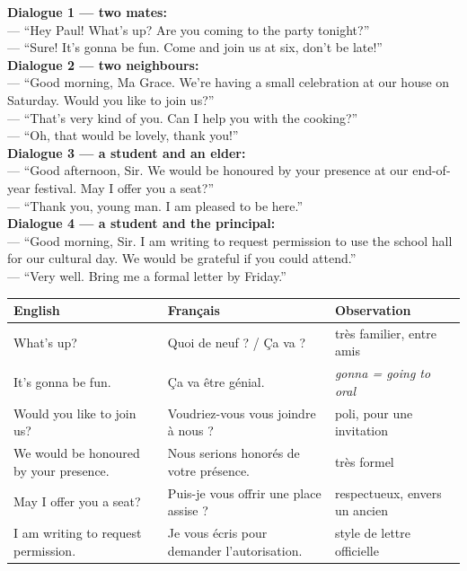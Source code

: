 \documentclass[11pt]{article}
\newcommand{\eng}[1]{\ifmmode\text{\textit{#1}}\else\begingroup\selectlanguage{english}\itshape #1\endgroup\fi}
\begin{document}
\begin{textebox}
\textbf{Dialogue 1 — two mates:}\\
— “Hey Paul! What's up? Are you coming to the party tonight?”\\
— “Sure! It's gonna be fun. Come and join us at six, don't be late!”\\[4pt]
\textbf{Dialogue 2 — two neighbours:}\\
— “Good morning, Ma Grace. We're having a small celebration at our house on Saturday. Would you like to join us?”\\
— “That's very kind of you. Can I help you with the cooking?”\\
— “Oh, that would be lovely, thank you!”\\[4pt]
\textbf{Dialogue 3 — a student and an elder:}\\
— “Good afternoon, Sir. We would be honoured by your presence at our end-of-year festival. May I offer you a seat?”\\
— “Thank you, young man. I am pleased to be here.”\\[4pt]
\textbf{Dialogue 4 — a student and the principal:}\\
— “Good morning, Sir. I am writing to request permission to use the school hall for our cultural day. We would be grateful if you could attend.”\\
— “Very well. Bring me a formal letter by Friday.”
\end{textebox}

\begin{center}
\begin{tabularx}{\linewidth}{|X|X|X|}\hline
\rowcolor{popblueL} \textbf{English} & \textbf{Français} & \textbf{Observation} \\ \hline
What's up? & Quoi de neuf ? / Ça va ? & très familier, entre amis \\ \hline
It's gonna be fun. & Ça va être génial. & \eng{gonna} = \eng{going to} oral \\ \hline
Would you like to join us? & Voudriez-vous vous joindre à nous ? & poli, pour une invitation \\ \hline
We would be honoured by your presence. & Nous serions honorés de votre présence. & très formel \\ \hline
May I offer you a seat? & Puis-je vous offrir une place assise ? & respectueux, envers un ancien \\ \hline
I am writing to request permission. & Je vous écris pour demander l'autorisation. & style de lettre officielle \\ \hline
\end{tabularx}
\end{center}
\end{document}
